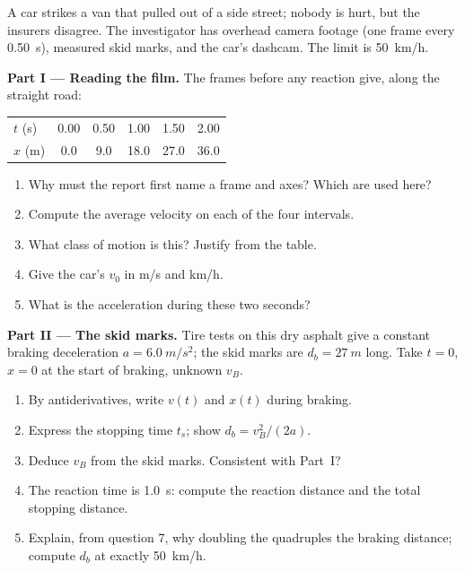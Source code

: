 \begin{problem}
\label{pb:g12:kinematics-2d:1}
A car strikes a van that pulled out of a side street; nobody is hurt,
but the insurers disagree. The investigator has overhead camera
footage (one frame every \qty{0.50}{s}), measured skid marks, and the
car's dashcam. The  limit is \qty{50}{km/h}.

\medskip
\noindent\textbf{Part I --- Reading the film.}
The frames before any reaction give, along the straight road:
\begin{center}\small
\begin{tabular}{lccccc}
$t$ (\unit{s}) & 0.00 & 0.50 & 1.00 & 1.50 & 2.00\\
$x$ (\unit{m}) & 0.0 & 9.0 & 18.0 & 27.0 & 36.0
\end{tabular}
\end{center}
\begin{enumerate}
  \item Why must the report first name a frame and axes? Which are
        used here?
  \item Compute the average velocity on each of the four intervals.
  \item What class of motion is this? Justify from the table.
  \item Give the car's  $v_0$ in \unit{m/s} and \unit{km/h}.
  \item What is the acceleration during these two seconds?
\end{enumerate}

\medskip
\noindent\textbf{Part II --- The skid marks.}
Tire tests on this dry asphalt give a constant braking deceleration
$a = \qty{6.0}{m/s^2}$; the skid marks are $d_b = \qty{27}{m}$ long.
Take $t = 0$, $x = 0$ at the start of braking, unknown  $v_B$.
\begin{enumerate}[resume]
  \item By antiderivatives, write $v(t)$ and $x(t)$ during braking.
  \item Express the stopping time $t_s$; show $d_b = v_B^2/(2a)$.
  \item Deduce $v_B$ from the skid marks. Consistent with Part~I?
  \item The reaction time is \qty{1.0}{s}: compute the reaction
        distance and the total stopping distance.
  \item Explain, from question 7, why doubling the  quadruples
        the braking distance; compute $d_b$ at exactly \qty{50}{km/h}.
\end{enumerate}


\end{problem}
